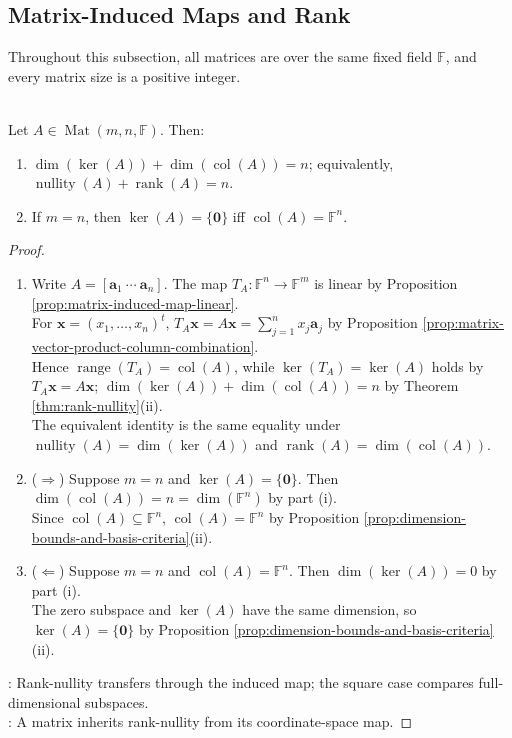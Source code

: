 \subsection{Matrix-Induced Maps and Rank}
Throughout this subsection, all matrices are over the same fixed field $\mathbb{F}$, and every matrix size is a positive integer.

\begin{corollary} \label{cor:matrix-rank-nullity} \\
Let $A\in\operatorname{Mat}(m,n,\mathbb{F})$. Then:
\begin{enumerate}[label=(\roman*)]
\setlength{\itemsep}{0pt}
\item $\dim(\ker(A))+\dim(\operatorname{col}(A))=n$; equivalently, $\operatorname{nullity}(A)+\operatorname{rank}(A)=n$.
\item If $m=n$, then $\ker(A)=\{\mathbf{0}\}$ iff $\operatorname{col}(A)=\mathbb{F}^n$.
\end{enumerate}
\begin{proof}
\begin{enumerate}[label=(\roman*)]
\setlength{\itemsep}{0pt}
\item[$(i)$] Write $A=[\mathbf{a}_1\ \cdots\ \mathbf{a}_n]$. The map $T_A:\mathbb{F}^n\to\mathbb{F}^m$ is linear by Proposition \ref{prop:matrix-induced-map-linear}.\\
For $\mathbf{x}=(x_1,\ldots,x_n)^t$, $T_A\mathbf{x}=A\mathbf{x}=\sum\limits_{j=1}^{n}x_j\mathbf{a}_j$ by Proposition \ref{prop:matrix-vector-product-column-combination}.\\
Hence $\operatorname{range}(T_A)=\operatorname{col}(A)$, while $\ker(T_A)=\ker(A)$ holds by $T_A\mathbf{x}=A\mathbf{x}$; $\dim(\ker(A))+\dim(\operatorname{col}(A))=n$ by Theorem \ref{thm:rank-nullity}(ii).\\
The equivalent identity is the same equality under $\operatorname{nullity}(A)=\dim(\ker(A))$ and $\operatorname{rank}(A)=\dim(\operatorname{col}(A))$.
\item[$(ii)$] ($\Rightarrow$) Suppose $m=n$ and $\ker(A)=\{\mathbf{0}\}$. Then $\dim(\operatorname{col}(A))=n=\dim(\mathbb{F}^n)$ by part (i).\\
Since $\operatorname{col}(A)\subseteq\mathbb{F}^n$, $\operatorname{col}(A)=\mathbb{F}^n$ by Proposition \ref{prop:dimension-bounds-and-basis-criteria}(ii).
\item[$(ii)$] ($\Leftarrow$) Suppose $m=n$ and $\operatorname{col}(A)=\mathbb{F}^n$. Then $\dim(\ker(A))=0$ by part (i).\\
The zero subspace and $\ker(A)$ have the same dimension, so $\ker(A)=\{\mathbf{0}\}$ by Proposition \ref{prop:dimension-bounds-and-basis-criteria}(ii).
\end{enumerate}
: Rank-nullity transfers through the induced map; the square case compares full-dimensional subspaces.\\
: A matrix inherits rank-nullity from its coordinate-space map.
\end{proof}
\end{corollary}

